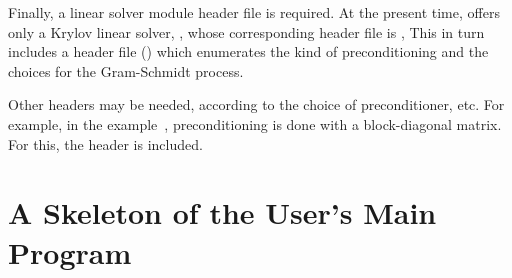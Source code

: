 Finally, a linear solver module header file is required. 
At the present time, {\kinsol} offers only a Krylov linear solver, {\kinspgmr},
whose corresponding header file is , 
This in turn includes a header file ()
which enumerates the kind of preconditioning and the choices for the
Gram-Schmidt process.

Other headers may be needed, according to the choice of
preconditioner, etc. For example, in the  example~\cite{kinsol2.2.0_ex}, 
preconditioning is done with a block-diagonal matrix. For this, the header
 is included.

\section{A Skeleton of the User's Main Program}\label{s:skeleton_sol}

